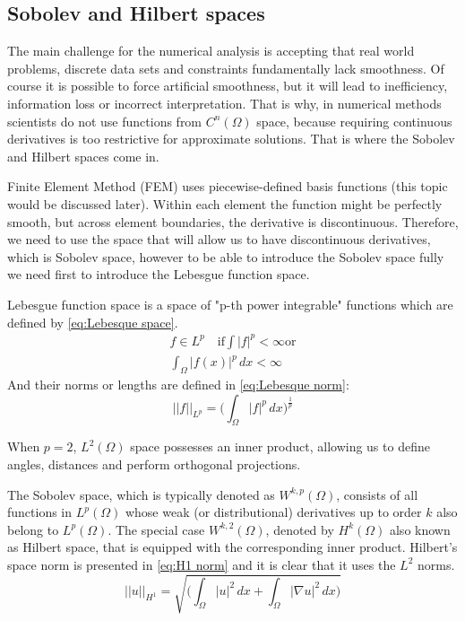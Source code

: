\documentclass[acmsmall,screen]{MapleTrans}
\begin{document}
\subsection{Sobolev and Hilbert spaces}
The main challenge for the numerical analysis is accepting that real world problems, discrete data sets and constraints fundamentally lack smoothness. 
Of course it is possible to force artificial smoothness, but it will lead to inefficiency, information loss or incorrect interpretation. 
That is why, in numerical methods scientists do not use functions from $C^{n}(\Omega)$ space, because requiring continuous derivatives is too restrictive for approximate solutions. 
That is where the Sobolev and Hilbert spaces come in.

Finite Element Method (FEM) uses piecewise-defined basis functions (this topic would be discussed later). Within each element the function might be perfectly smooth, but across element boundaries, the derivative is discontinuous. 
Therefore, we need to use the space that will allow us to have discontinuous derivatives, which is Sobolev space, however to be able to introduce the Sobolev space fully we need first to introduce the Lebesgue function space. 

Lebesgue function space is a space of "p-th power integrable" functions which are defined by \eqref{eq:Lebesque space}. 
\begin{equation}
\begin{aligned}
    f \in L^p \quad \text{if} \int |f|^p < \infty \text{or}\\
    \int_\Omega |f(x)|^p \, dx < \infty
    \label{eq:Lebesque space}
\end{aligned}
\end{equation}
And their norms or lengths are defined in \eqref{eq:Lebesque norm}:
\begin{equation}
    ||f||_{L^p} = \Bigg(\int_{\Omega} |f|^p \, dx \Bigg)^{\frac{1}{p}}
    \label{eq:Lebesque norm}
\end{equation}

When $p=2$, $L^{2}(\Omega)$ space possesses an inner product, allowing us to define angles, distances and perform orthogonal projections.

The Sobolev space, which is typically denoted as $W^{k, p}(\Omega)$, consists of all functions in $L^{p}(\Omega)$ whose weak (or distributional) derivatives up to order $k$ also belong to $L^{p}(\Omega)$. 
The special case $W^{k,2}(\Omega)$, denoted by $H^{k}(\Omega)$ also known as Hilbert space, that is equipped with the corresponding inner product. Hilbert's space norm is presented in \eqref{eq:H1 norm} and it is clear that it uses the $L^2$ norms. 
\begin{equation}
    ||u||_{H^1} = \sqrt{\Bigg(\int_\Omega |u|^2 \, dx + \int_\Omega |\nabla u|^2 \, dx \Bigg)}
    \label{eq:H1 norm}
\end{equation}
\end{document}

